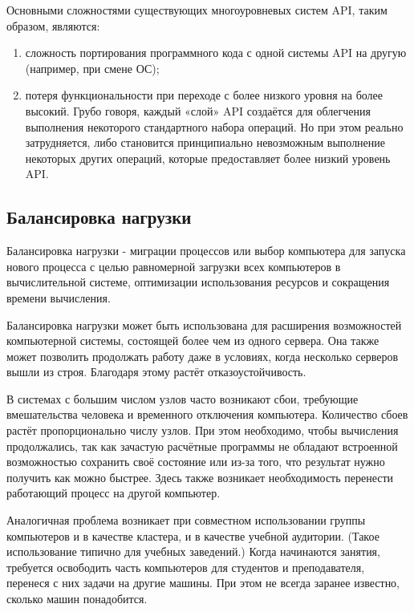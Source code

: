 Основными сложностями существующих многоуровневых систем API, таким образом, являются:
\begin{enumerate}
    \item сложность портирования программного кода с одной системы API на другую (например, при смене ОС);
    \item потеря функциональности при переходе с более низкого уровня на более высокий. Грубо говоря, каждый «слой» API создаётся для облегчения выполнения некоторого стандартного набора операций. Но при этом реально затрудняется, либо становится принципиально невозможным выполнение некоторых других операций, которые предоставляет более низкий уровень API.
\end{enumerate}



\subsection{Балансировка нагрузки}

Балансировка нагрузки  - миграции процессов или выбор компьютера для запуска нового процесса с целью равномерной загрузки всех компьютеров в вычислительной системе, оптимизации использования ресурсов и сокращения времени вычисления.

Балансировка нагрузки может быть использована для расширения возможностей компьютерной системы, состоящей более чем из одного сервера. Она также может позволить продолжать работу даже в условиях, когда несколько серверов вышли из строя. Благодаря этому растёт отказоустойчивость.

В системах с большим числом узлов часто возникают сбои, требующие вмешательства человека и временного отключения компьютера. Количество сбоев растёт пропорционально числу узлов. При этом необходимо, чтобы вычисления продолжались, так как зачастую расчётные программы не обладают встроенной возможностью сохранить своё состояние или из-за того, что результат нужно получить как можно быстрее. Здесь также возникает необходимость перенести работающий процесс на другой компьютер.

Аналогичная проблема возникает при совместном использовании группы компьютеров и в качестве кластера, и в качестве учебной аудитории. (Такое использование типично для учебных заведений.) Когда начинаются занятия, требуется освободить часть компьютеров для студентов и преподавателя, перенеся с них задачи на другие машины. При этом не всегда заранее известно, сколько машин понадобится.

